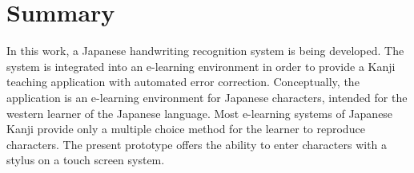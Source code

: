
\chapter*{Summary}
\label{chap:summary}
\pagestyle{empty}


  



    



In this work, a Japanese handwriting recognition system is being developed.
The system is integrated into an e-learning environment in order to provide 
a Kanji teaching application with automated error correction.
Conceptually, the application is an e-learning environment for Japanese 
characters, intended for the western learner of the Japanese language. 
Most e-learning systems of Japanese Kanji provide only a multiple choice method
for the learner to reproduce characters. The present prototype offers the
ability to enter characters with a stylus on a touch screen system.

